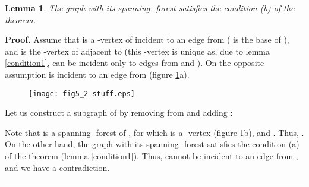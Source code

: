 \documentclass[a4paper, 12pt]{article}
\newtheorem{lemma}{Lemma}[subsection]
\newenvironment{proof}[1][Proof]{\noindent\textbf{#1.} }{\ \rule{0.5em}{0.5em}}
\begin{document}
\begin{lemma} \label{condition2}
The graph  with its spanning -forest  satisfies the
condition (b) of the theorem.
\end{lemma}
\begin{proof}
Assume that  is a -vertex of  incident to an edge 
from  ( is the base of ), and  is the
-vertex of  adjacent to  (this -vertex is unique as, due
to lemma \ref{condition1},  can be incident only to edges from
 and ). On the opposite assumption  is
incident to an edge  from  (figure
\ref{fig_2_stuff}a).

\begin{figure}[h]
\begin{center}
\texttt{[image: fig5\_2-stuff.eps]}\\
\caption{}\label{fig_2_stuff}
\end{center}
\end{figure}

Let us construct a subgraph  of  by removing  from
 and adding :

Note that  is a spanning -forest of , for which  is a
-vertex (figure \ref{fig_2_stuff}b), and .
Thus, . On the other hand, the graph  with
its spanning -forest  satisfies the condition (a) of the
theorem (lemma \ref{condition1}). Thus,  cannot be incident to an
edge from , and we have a contradiction.
\end{proof}
\end{document}
